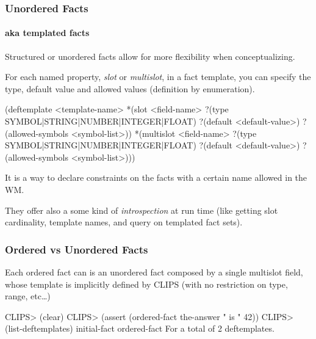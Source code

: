 \documentclass[xcolor={usenames,dvipsnames,svgnames}, compress]{beamer}
\begin{document}
\begin{frame}[fragile]
  \frametitle{Unordered Facts}
  \framesubtitle{aka templated facts}
  Structured or unordered facts allow for more flexibility when
  conceptualizing.\par
  For each named property, \emph{slot} or \emph{multislot}, in a fact template, you can specify the
   type, default value and allowed values (definition by enumeration).
  \begin{clips-code}[numbers=none]
    (deftemplate <template-name>
        *(slot <field-name>
            ?(type SYMBOL|STRING|NUMBER|INTEGER|FLOAT)
            ?(default <default-value>)
            ?(allowed-symbols <symbol-list>))
        *(multislot <field-name>
            ?(type SYMBOL|STRING|NUMBER|INTEGER|FLOAT)
            ?(default <default-value>)
            ?(allowed-symbols <symbol-list>)))
          \end{clips-code}
          
   It is a way to declare constraints on the facts with a certain
   name allowed in the WM.\par\bigskip
   
   They offer also a some kind of \emph{introspection} at run time (like
   getting slot cardinality, template names, and query on templated fact sets).
\end{frame}

\begin{frame}[fragile]
  \frametitle{Ordered vs Unordered Facts}
  Each ordered fact can is an unordered fact composed by a single
  multislot field, whose template is implicitly defined by CLIPS (with
  no restriction on type, range, etc\dots)
  \begin{clips-code}
    CLIPS> (clear)
    CLIPS> (assert (ordered-fact the-answer " is "  42))
    CLIPS> (list-deftemplates)
    initial-fact
    ordered-fact
    For a total of 2 deftemplates.
  \end{clips-code}
\end{frame}
\end{document}
